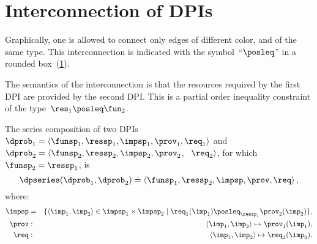 

\section{Interconnection of DPIs}


Graphically, one is allowed to connect only edges of different
color, and of the same type. This interconnection is indicated with the symbol~``$\posleq$''
in a rounded box~(\cref{fig:connection}).

\begin{figure}[h]
  \centering
  \caption{\label{fig:connection}}
\end{figure}


\noindent The semantics of the interconnection is that the resources
required by the first DPI are provided by the second DPI. This is
a partial order inequality constraint of the type~$\res_{1}\posleq\fun_{2}$.


\begin{definition}
  \label{def:series-composition}The series composition of two DPIs
  ~$\dprob_{1}=\langle\funsp_{1},\ressp_{1},\impsp_{1},\prov_{1},\req_{1}\rangle$
  and~$\dprob_{2}=\langle\funsp_{2},\ressp_{2},\impsp_{2},\prov_{2}$,
  ~$\req_{2}\rangle$, for which~$\funsp_{2}=\ressp_{1}$, is
  \begin{equation}
    \dpseries(\dprob_{1},\dprob_{2})\doteq\left\langle \funsp_{1},\ressp_{2},\impsp,\prov,\req\right\rangle ,
  \end{equation}
  where:
  \begin{eqnarray}
    \impsp & = & \{\left\langle \imp_{1},\imp_{2}\right\rangle \in\impsp_{1}\times\impsp_{2}\mid\req_{1}(\imp_{1})\posleq_{\ressp_{1}}\prov_{2}(\imp_{2})\},\\
    \prov & : & \left\langle \imp_{1},\imp_{2}\right\rangle \mapsto\prov_{1}(\imp_{1}),\\
    \req & : & \left\langle \imp_{1},\imp_{2}\right\rangle \mapsto\req_{2}(\imp_{2}).
  \end{eqnarray}
\end{definition}







